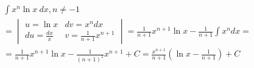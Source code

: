 
\begin{gather*}
  \int x^n\ln x \ dx, n\neq -1 \\
  = \begin{vmatrix}
    u=\ln x & dv=x^ndx \\
    du=\frac{dx}{x} & v=\frac{1}{n+1}x^{n+1}
  \end{vmatrix}
  = \frac{1}{n+1}x^{n+1}\ln x - \frac{1}{n+1}\int x^ndx = \\
  = \frac{1}{n+1}x^{n+1}\ln x - \frac{1}{(n+1)^2}x^{n+1}+C
  = \frac{x^{n+1}}{n+1}\left(\ln x-\frac{1}{n+1}\right)+C
\end{gather*}

